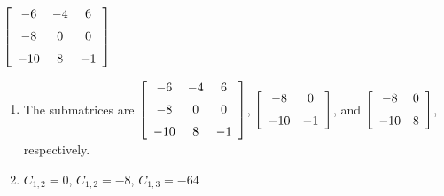 {$\left[ \begin {array}{ccc} -6&-4&6\\\noalign{\medskip}-8&0&0
\\\noalign{\medskip}-10&8&-1\end {array} \right] $} 
{\begin{enumerate}
\item The submatrices are 
$\left[ \begin {array}{ccc} -6&-4&6\\\noalign{\medskip}-8&0&0
\\\noalign{\medskip}-10&8&-1\end {array} \right] $, 
 $\left[ \begin {array}{cc} -8&0\\\noalign{\medskip}-10&-1\end {array}
 \right]$, and 
 $\left[ \begin {array}{cc} -8&0\\\noalign{\medskip}-10&8\end {array}
 \right]$, respectively.
 \item	$C_{1,2}=0$, $C_{1,2}=-8$, $C_{1,3}=-64$
 \end{enumerate}
}

  

 

